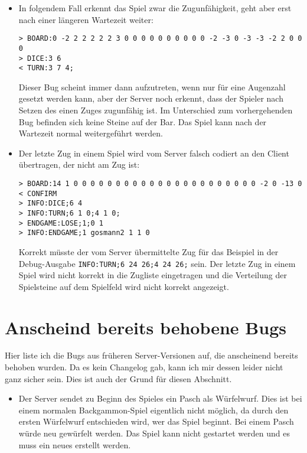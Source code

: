 \begin{itemize}
\item {} In folgendem Fall erkennt das Spiel zwar die Zugunfähigkeit, geht aber erst nach einer längeren Wartezeit weiter:
\begin{lstlisting}
> BOARD:0 -2 2 2 2 2 2 3 0 0 0 0 0 0 0 0 0 0 -2 -3 0 -3 -3 -2 2 0 0 0
> DICE:3 6
< TURN:3 7 4;
\end{lstlisting}
Dieser Bug scheint immer dann aufzutreten, wenn nur für eine Augenzahl gesetzt werden kann, aber der Server noch erkennt, dass der Spieler nach Setzen des einen Zuges zugunfähig ist. Im Unterschied zum vorhergehenden Bug befinden sich keine Steine auf der Bar.
 Das Spiel kann nach der Wartezeit normal weitergeführt werden.

\item {} Der letzte Zug in einem Spiel wird vom Server falsch codiert an den Client übertragen, der nicht am Zug ist:
\begin{lstlisting}
> BOARD:14 1 0 0 0 0 0 0 0 0 0 0 0 0 0 0 0 0 0 0 0 0 0 0 -2 0 -13 0
< CONFIRM
> INFO:DICE;6 4
> INFO:TURN;6 1 0;4 1 0;
> ENDGAME:LOSE;1;0 1
> INFO:ENDGAME;1 gosmann2 1 1 0
\end{lstlisting}
Korrekt müsste der vom Server übermittelte Zug für das Beispiel in der Debug-Ausgabe \lstinline$INFO:TURN;6 24 26;4 24 26;$ sein.
 Der letzte Zug in einem Spiel wird nicht korrekt in die Zugliste eingetragen und die Verteilung der Spielsteine auf dem Spielfeld wird nicht korrekt angezeigt.

\end{itemize}

\section{Anscheind bereits behobene Bugs}
Hier liste ich die Bugs aus früheren Server-Versionen auf, die anscheinend bereits behoben wurden. Da es kein Changelog gab, kann ich mir dessen leider nicht ganz sicher sein. Dies ist auch der Grund für diesen Abschnitt.
\begin{itemize}
\item {} Der Server sendet zu Beginn des Spieles ein Pasch als Würfelwurf. Dies ist bei einem normalen Backgammon-Spiel eigentlich nicht möglich, da durch den ersten Würfelwurf entschieden wird, wer das Spiel beginnt. Bei einem Pasch würde neu gewürfelt werden.
 Das Spiel kann nicht gestartet werden und es muss ein neues erstellt werden.
\end{itemize}

